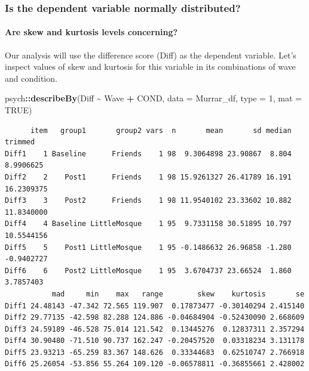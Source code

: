 \documentclass[
  11pt,
]{book}
\newenvironment{Shaded}{\begin{snugshade}}{\end{snugshade}}
\newcommand{\AttributeTok}[1]{\textcolor[rgb]{0.27,0.27,0.27}{#1}}
\newcommand{\ConstantTok}[1]{\textcolor[rgb]{0.37,0.37,0.37}{#1}}
\newcommand{\DecValTok}[1]{\textcolor[rgb]{0.06,0.06,0.06}{#1}}
\newcommand{\FunctionTok}[1]{\textcolor[rgb]{0.27,0.27,0.27}{\textbf{#1}}}
\newcommand{\NormalTok}[1]{#1}
\newcommand{\SpecialCharTok}[1]{\textcolor[rgb]{0.43,0.43,0.43}{\textbf{#1}}}
\begin{document}
\hypertarget{is-the-dependent-variable-normally-distributed-1}{%
\subsubsection{Is the dependent variable normally distributed?}\label{is-the-dependent-variable-normally-distributed-1}}

\hypertarget{are-skew-and-kurtosis-levels-concerning}{%
\paragraph{Are skew and kurtosis levels concerning?}\label{are-skew-and-kurtosis-levels-concerning}}

Our analysis will use the difference score (Diff) as the dependent variable. Let's inspect values of skew and kurtosis for this variable in its combinations of wave and condition.

\begin{Shaded}
\begin{Highlighting}[]
\NormalTok{psych}\SpecialCharTok{::}\FunctionTok{describeBy}\NormalTok{(Diff }\SpecialCharTok{\textasciitilde{}}\NormalTok{ Wave }\SpecialCharTok{+}\NormalTok{ COND, }\AttributeTok{data =}\NormalTok{ Murrar\_df, }\AttributeTok{type =} \DecValTok{1}\NormalTok{, }\AttributeTok{mat =} \ConstantTok{TRUE}\NormalTok{)}
\end{Highlighting}
\end{Shaded}

\begin{verbatim}
      item   group1       group2 vars  n       mean       sd median    trimmed
Diff1    1 Baseline      Friends    1 98  9.3064898 23.90867  8.804  8.9906625
Diff2    2    Post1      Friends    1 98 15.9261327 26.41789 16.191 16.2309375
Diff3    3    Post2      Friends    1 98 11.9540102 23.33602 10.882 11.8340000
Diff4    4 Baseline LittleMosque    1 95  9.7331158 30.51895 10.797 10.5544156
Diff5    5    Post1 LittleMosque    1 95 -0.1486632 26.96858 -1.280 -0.9402727
Diff6    6    Post2 LittleMosque    1 95  3.6704737 23.66524  1.860  3.7857403
           mad     min    max   range        skew    kurtosis       se
Diff1 24.48143 -47.342 72.565 119.907  0.17873477 -0.30140294 2.415140
Diff2 29.77135 -42.598 82.288 124.886 -0.04684904 -0.52430090 2.668609
Diff3 24.59189 -46.528 75.014 121.542  0.13445276  0.12837311 2.357294
Diff4 30.90480 -71.510 90.737 162.247 -0.20457520  0.03318234 3.131178
Diff5 23.93213 -65.259 83.367 148.626  0.33344683  0.62510747 2.766918
Diff6 25.26054 -53.856 55.264 109.120 -0.06578811 -0.36855661 2.428002
\end{verbatim}
\end{document}
